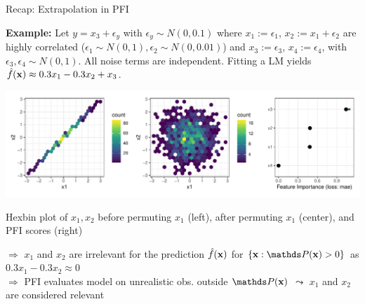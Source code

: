 \documentclass[11pt,compress,t,notes=noshow, aspectratio=169, xcolor=table]{beamer}
\begin{document}
\begin{vbframe}{Recap: Extrapolation in PFI}
 
 \textbf{Example:} Let $y = x_3 + \epsilon_y$ with $\epsilon_y \sim N(0, 0.1)$ where $x_1 :=  \epsilon_1$, $x_2 := x_1 + \epsilon_2$ are highly correlated ($\epsilon_1 \sim N(0,1), \epsilon_2 \sim N(0, 0.01)$) and $x_3 := \epsilon_3$, $x_4 := \epsilon_4$,  with $\epsilon_3, \epsilon_4 \sim N(0,1)$. All noise terms are independent.
 Fitting a LM yields $\fh(\xv) \approx 0.3 x_1 - 0.3 x_2 + x_3$.

\centerline{\includegraphics[width=0.9\linewidth]{figure_man/pfi_hexbin_extrapolation.pdf}}
\centerline{Hexbin plot of $x_1, x_2$ before permuting $x_1$ (left), after permuting $x_1$ (center), and PFI scores (right)}
\lz
% 
$\Rightarrow$ $x_1$ and $x_2$ are irrelevant for the prediction $\fh(\xv)$ for $\{\xv: \P(\xv) > 0\}$ as $0.3 x_1 - 0.3 x_2 \approx 0$ \\
$\Rightarrow$ PFI evaluates model on unrealistic obs. outside $\P(\xv)$ $\leadsto$ $x_1$ and $x_2$ are considered relevant

 \end{vbframe}
\end{document}
